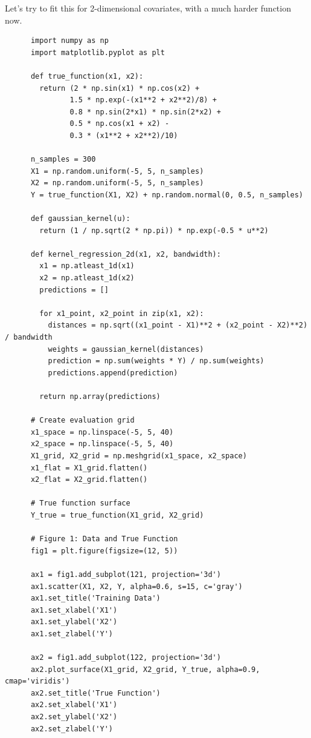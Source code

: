   \begin{example} 
    Let's try to fit this for 2-dimensional covariates, with a much harder function now. 

    \begin{lstlisting}
      import numpy as np
      import matplotlib.pyplot as plt

      def true_function(x1, x2):
        return (2 * np.sin(x1) * np.cos(x2) + 
               1.5 * np.exp(-(x1**2 + x2**2)/8) + 
               0.8 * np.sin(2*x1) * np.sin(2*x2) +
               0.5 * np.cos(x1 + x2) - 
               0.3 * (x1**2 + x2**2)/10)

      n_samples = 300
      X1 = np.random.uniform(-5, 5, n_samples)
      X2 = np.random.uniform(-5, 5, n_samples)
      Y = true_function(X1, X2) + np.random.normal(0, 0.5, n_samples)

      def gaussian_kernel(u):
        return (1 / np.sqrt(2 * np.pi)) * np.exp(-0.5 * u**2)

      def kernel_regression_2d(x1, x2, bandwidth):
        x1 = np.atleast_1d(x1)
        x2 = np.atleast_1d(x2)
        predictions = []
        
        for x1_point, x2_point in zip(x1, x2):
          distances = np.sqrt((x1_point - X1)**2 + (x2_point - X2)**2) / bandwidth
          weights = gaussian_kernel(distances)
          prediction = np.sum(weights * Y) / np.sum(weights)
          predictions.append(prediction)
        
        return np.array(predictions)

      # Create evaluation grid
      x1_space = np.linspace(-5, 5, 40)
      x2_space = np.linspace(-5, 5, 40)
      X1_grid, X2_grid = np.meshgrid(x1_space, x2_space)
      x1_flat = X1_grid.flatten()
      x2_flat = X2_grid.flatten()

      # True function surface
      Y_true = true_function(X1_grid, X2_grid)

      # Figure 1: Data and True Function
      fig1 = plt.figure(figsize=(12, 5))

      ax1 = fig1.add_subplot(121, projection='3d')
      ax1.scatter(X1, X2, Y, alpha=0.6, s=15, c='gray')
      ax1.set_title('Training Data')
      ax1.set_xlabel('X1')
      ax1.set_ylabel('X2')
      ax1.set_zlabel('Y')

      ax2 = fig1.add_subplot(122, projection='3d')
      ax2.plot_surface(X1_grid, X2_grid, Y_true, alpha=0.9, cmap='viridis')
      ax2.set_title('True Function')
      ax2.set_xlabel('X1')
      ax2.set_ylabel('X2')
      ax2.set_zlabel('Y')


\end{lstlisting}
\end{example}
